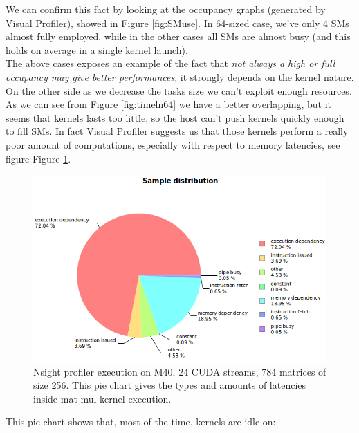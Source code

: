 We can confirm this fact by looking at the occupancy graphs (generated by Visual Profiler), showed in Figure \ref{fig:SMuse}. In 64-sized case, we've only 4 SMs almost fully employed, while in the other cases all SMs are almost busy (and this holds on average in a single kernel launch).\\
The above cases exposes an example of the fact that \textit{not always a high or full occupancy may give better performances}, it strongly depends on the kernel nature\cite{loweroccupancy,cudabestpractices}.\\
On the other side as we decrease the tasks size we can't exploit enough resources. As we can see from Figure \ref{fig:timeln64} we have a better overlapping, but it seems that kernels lasts too little, so the host can't push kernels quickly enough to fill SMs. In fact Visual Profiler suggests us that those kernels perform a really poor amount of computations, especially with respect to memory latencies, see figure Figure \ref{fig:mat62latency}.
%
\begin{figure}[!tb]
	\vspace{-1cm}
	\hspace{-1cm}
	\includegraphics[scale=0.8]{plots/matmul784_64_kerlatencies.png}
	\caption{Nsight profiler execution on M40, 24 CUDA streams, 784 matrices of size 256. This pie chart gives the types and amounts of latencies inside mat-mul kernel execution.}
	\label{fig:mat62latency}
\end{figure}
%
%
This pie chart shows that, most of the time, kernels are idle on:\\\\
